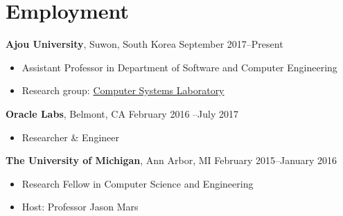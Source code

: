 \section*{Employment}

\begin{description}
\item {\bf Ajou University}, Suwon, South Korea \dotfill September 2017--Present
  \begin{itemize}
  \item Assistant Professor in Department of Software and Computer Engineering
  \item Research group: \href{http://csl.ajou.ac.kr}{Computer Systems Laboratory}
  \end{itemize}
  
\item {\bf Oracle Labs}, Belmont, CA \dotfill February 2016 --July 2017
  \begin{itemize}
  \item Researcher \& Engineer
  \end{itemize}

\item {\bf The University of Michigan}, Ann Arbor, MI \dotfill February 2015--January 2016
  \begin{itemize}
  \item Research Fellow in Computer Science and Engineering
  \item Host: Professor Jason Mars
  \end{itemize}
\end{description}

